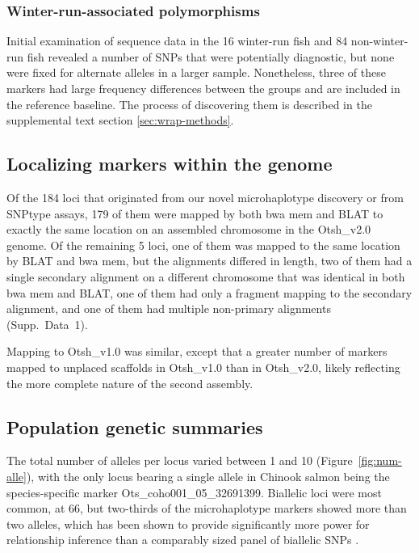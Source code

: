 \subsubsection*{Winter-run-associated polymorphisms}

Initial examination of sequence data 
in the 16 winter-run fish and 84 non-winter-run fish revealed
a number of SNPs that were potentially diagnostic, but none were fixed for alternate alleles 
in a larger sample.
Nonetheless, three of these markers had large frequency differences
between the groups and are included in the reference baseline.  The process of 
discovering them is described in the supplemental text section \ref{sec:wrap-methods}.

\subsection*{Localizing markers within the genome}

Of the 184 loci that originated from our novel
microhaplotype discovery or from SNPtype assays, 179 of them were mapped by both bwa mem and
BLAT to exactly the same location
on an assembled chromosome in the Otsh\_v2.0 genome.
Of the remaining 5 loci, one of them was mapped to the same location by BLAT and bwa mem, but
the alignments differed in length, two of them had a single secondary alignment on a different chromosome
that was identical in both bwa mem and BLAT, one of them had only a fragment mapping to
the secondary alignment, and one of them had multiple
non-primary alignments (Supp.~Data~1).

Mapping to Otsh\_v1.0 was similar, except that a greater number of markers mapped to unplaced
scaffolds in Otsh\_v1.0 than in Otsh\_v2.0, likely reflecting the more complete nature of the
second assembly.


\subsection*{Population genetic summaries}

The total number of alleles per locus varied between 1 and 10 (Figure~\ref{fig:num-alle}), with the
only locus bearing a single allele in Chinook salmon being the species-specific marker Ots\_coho001\_05\_32691399. 
Biallelic loci were most common, at 66, but two-thirds of the microhaplotype markers
showed more than two alleles, which has been shown to provide significantly more
power for relationship inference than a comparably sized panel of biallelic SNPs
\citep{baetscher2018microhaplotypes}.


